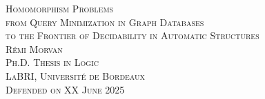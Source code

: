 \begin{titlepage}
\begin{center}
  \Huge\scshape{%
  Homomorphism Problems}\\[.4cm]
  \Large\scshape{%
  from Query Minimization in Graph Databases\\[.2cm]to the Frontier of Decidability in Automatic Structures}\\
  \vfill
  \normalfont\LARGE{} \textsc{Rémi Morvan}\\[1em]
  \Large\scshape
  Ph.D. Thesis in Logic\\
  \textcolor{maincolor}{LaBRI, Université de Bordeaux}\\
  \normalfont\Large\scshape Defended on XX June 2025
\end{center}
\end{titlepage}
\restoregeometry